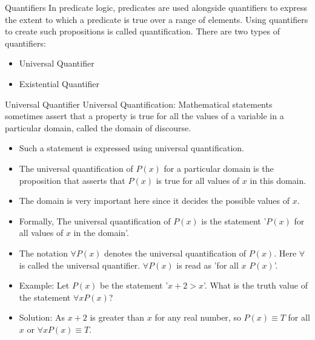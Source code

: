 \documentclass[aspectratio=169, xcolor=dvipsnames]{beamer}
\begin{document}
\begin{frame}{Quantifiers}
    In predicate logic, predicates are used alongside quantifiers to express the extent to which a predicate is true over a range of elements. Using quantifiers to create such propositions is called quantification. There are two types of quantifiers:
    \begin{itemize}[<+->]
        \item Universal Quantifier
        \item Existential Quantifier
    \end{itemize}
\end{frame}

\begin{frame}{Universal Quantifier}
    Universal Quantification: Mathematical statements sometimes assert that a property is true for all the values of a variable in a particular domain, called the domain of discourse.
    \begin{itemize}[<+->]
        \item Such a statement is expressed using universal quantification.
        \item The universal quantification of $P(x)$ for a particular domain is the proposition that asserts that $P(x)$ is true for all values of $x$ in this domain.
        \item The domain is very important here since it decides the possible values of $x$.
        \item Formally, The universal quantification of $P(x)$ is the statement '$P(x)$ for all values of $x$ in the domain'.
        \item The notation $\forall P(x)$ denotes the universal quantification of $P(x)$. Here $\forall$ is called the universal quantifier. $\forall P(x)$ is read as 'for all $x$ $P(x)$'.
        \item Example: Let $P(x)$ be the statement '$x + 2 > x$'. What is the truth value of the statement $\forall x P(x)$?
        \item Solution: As $x + 2$ is greater than $x$ for any real number, so $P(x) \equiv T$ for all $x$ or $\forall x P(x) \equiv T$.
    \end{itemize}
\end{frame}
\end{document}
